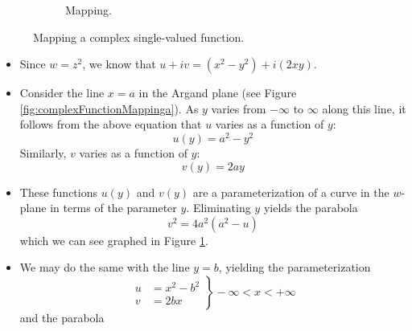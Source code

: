 \documentclass[../main.tex]{subfiles}
\begin{document}
\begin{itemize}
\begin{figure}[h!]
\begin{subfigure}[b]{0.49\linewidth}
            \caption{Mapping.}
            \label{fig:complexFunctionMappingb}
        \end{subfigure}
        \caption{Mapping a complex single-valued function.}
        \label{fig:complexFunctionMapping}
    \end{figure}
    \begin{itemize}
        \item Since $w=z^2$, we know that $u+iv=(x^2-y^2)+i(2xy)$.
        \item Consider the line $x=a$ in the Argand plane (see Figure \ref{fig:complexFunctionMappinga}). As $y$ varies from $-\infty$ to $\infty$ along this line, it follows from the above equation that $u$ varies as a function of $y$:
        \begin{equation*}
            u(y) = a^2-y^2
        \end{equation*}
        Similarly, $v$ varies as a function of $y$:
        \begin{equation*}
            v(y) = 2ay
        \end{equation*}
        \item These functions $u(y)$ and $v(y)$ are a parameterization of a curve in the $w$-plane in terms of the parameter $y$. Eliminating $y$ yields the parabola
        \begin{equation*}
            v^2 = 4a^2(a^2-u)
        \end{equation*}
        which we can see graphed in Figure \ref{fig:complexFunctionMappingb}.
        \item We may do the same with the line $y=b$, yielding the parameterization
        \begin{equation*}
            \left.
                \begin{aligned}
                    u &= x^2-b^2\\
                    v &= 2bx
                \end{aligned}
            \right\} -\infty<x<+\infty
        \end{equation*}
        and the parabola
        \begin{equation*}

\end{equation*}
\end{itemize}
\end{itemize}
\end{document}
